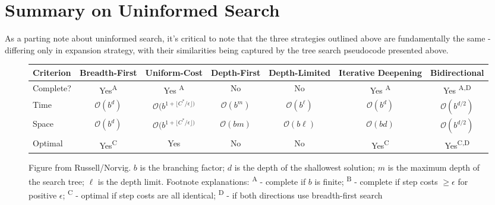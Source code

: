 \documentclass{article}[letterpaper]
\begin{document}
\newpage

\section*{Summary on Uninformed Search}
As a parting note about uninformed search, it’s critical to note that the three strategies outlined above are fundamentally the same - differing only in expansion strategy, with their similarities being captured by the tree search pseudocode presented above.
\begin{figure}[h!]
\begin{tabular}{l | c | c | c | c | c | c}
Criterion & Breadth-First & Uniform-Cost & Depth-First & Depth-Limited & Iterative Deepening & Bidirectional  \\ \hline \hline
Complete? & Yes\textsuperscript{A} & Yes \textsuperscript{A}  & No & No & Yes \textsuperscript{A} & Yes \textsuperscript{A,D} \\ \hline
Time           & $\mathcal{O}(b^d)$       &  $\mathcal{O}(b^{1 + \lfloor C^*/ \epsilon \rfloor)}$ & $\mathcal{O}(b^m) $ & $\mathcal{O}(b^\ell) $ & $\mathcal{O}(b^d)$  & $\mathcal{O}(b^{d/2})$ \\ \hline  
Space         & $\mathcal{O}(b^d)$       &  $\mathcal{O}(b^{1 + \lfloor C^*/ \epsilon \rfloor)}$  & $\mathcal{O}(bm)$ &   $\mathcal{O}(b\ell) $  & $\mathcal{O}(bd)$  & $\mathcal{O}(b^{d/2})$ \\ \hline  
Optimal       &  Yes\textsuperscript{C} & Yes                                                                             & No                          & No                               & Yes\textsuperscript{C} & Yes\textsuperscript{C,D} \\ \hline
\end{tabular}
\caption{Figure from Russell/Norvig.  $b$ is the branching factor; $d$ is the depth of the shallowest solution; $m$ is the maximum depth of the search tree; $\ell$ is
the depth limit.  Footnote explanations: \textsuperscript{A} - complete if $b$ is finite;
\textsuperscript{B} - complete if step costs $\ge \epsilon$ for positive $\epsilon$;
\textsuperscript{C} - optimal if step costs are all identical;
\textsuperscript{D} - if both directions use breadth-first search
}
\end{figure}
\end{document}
